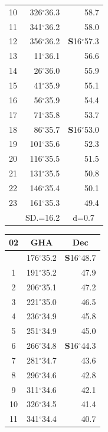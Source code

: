 \documentclass[10pt, a4paper]{report}
\begin{document}
\begin{scriptsize}
\begin{tabular*}{0.2\textwidth}[t]{@{\extracolsep{\fill}}|c|rr|}
10 & 326$^\circ$36.3 & 58.7\\
11 & 341$^\circ$36.2 & 58.0\\[2Pt]
12 & 356$^\circ$36.2 & \textbf{S}16$^\circ$57.3\\
13 & 11$^\circ$36.1 & 56.6\\
14 & 26$^\circ$36.0 & 55.9\\
15 & 41$^\circ$35.9 & \raisebox{0.24ex}{\boldmath$\cdot$~\boldmath$\cdot$~~}55.1\\
16 & 56$^\circ$35.9 & 54.4\\
17 & 71$^\circ$35.8 & 53.7\\[2Pt]
18 & 86$^\circ$35.7 & \textbf{S}16$^\circ$53.0\\
19 & 101$^\circ$35.6 & 52.3\\
20 & 116$^\circ$35.5 & 51.5\\
21 & 131$^\circ$35.5 & \raisebox{0.24ex}{\boldmath$\cdot$~\boldmath$\cdot$~~}50.8\\
22 & 146$^\circ$35.4 & 50.1\\
23 & 161$^\circ$35.3 & 49.4\\
\hline
\rule{0pt}{2.4ex} & \multicolumn{1}{c}{SD.=16.2} & \multicolumn{1}{c|}{d=0.7}\\
\hline
\end{tabular*}\noindent
\begin{tabular*}{0.2\textwidth}[t]{@{\extracolsep{\fill}}|c|rr|}
\hline
\multicolumn{1}{|c|}{\rule{0pt}{2.6ex}\textbf{02}} & \multicolumn{1}{c}{\textbf{GHA}} & \multicolumn{1}{c|}{\textbf{Dec}}\\
\hline\rule{0pt}{2.6ex}\noindent
0 & 176$^\circ$35.2 & \textbf{S}16$^\circ$48.7\\
1 & 191$^\circ$35.2 & 47.9\\
2 & 206$^\circ$35.1 & 47.2\\
3 & 221$^\circ$35.0 & \raisebox{0.24ex}{\boldmath$\cdot$~\boldmath$\cdot$~~}46.5\\
4 & 236$^\circ$34.9 & 45.8\\
5 & 251$^\circ$34.9 & 45.0\\[2Pt]
6 & 266$^\circ$34.8 & \textbf{S}16$^\circ$44.3\\
7 & 281$^\circ$34.7 & 43.6\\
8 & 296$^\circ$34.6 & 42.8\\
9 & 311$^\circ$34.6 & \raisebox{0.24ex}{\boldmath$\cdot$~\boldmath$\cdot$~~}42.1\\
10 & 326$^\circ$34.5 & 41.4\\
11 & 341$^\circ$34.4 & 40.7\\[2Pt]

\end{tabular*}
\end{scriptsize}
\end{document}
